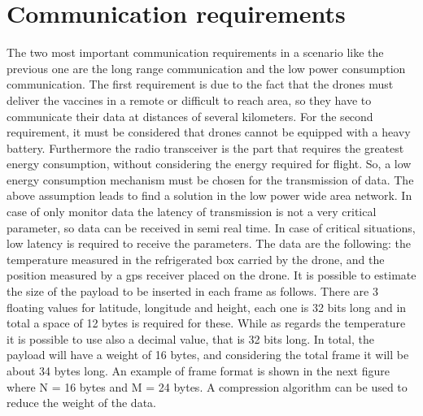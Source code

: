 \documentclass[12pt]{report}
\begin{document}
\chapter{Communication requirements}

The two most important communication requirements in a scenario like the previous one are the
long range communication and the low power consumption communication. The first requirement is 
due to the fact that the drones must deliver the vaccines in a remote or difficult to reach 
area, so they have to communicate their data at distances of several kilometers. For the second
requirement, it must be considered that drones cannot be equipped with a heavy battery. 
Furthermore the radio transceiver is the part that requires the greatest energy consumption, 
without considering the energy required for flight. So, a low energy consumption mechanism 
must be chosen for the transmission of data. The above assumption leads to find a solution in 
the low power wide area network. In case of only monitor data the latency of transmission is not a very
critical parameter, so data can be received in semi real time. In case of critical situations, low latency is required to receive the parameters. The data are 
the following:
the temperature measured in the refrigerated box carried by the drone, and
the position measured by a gps receiver placed on the drone. It is possible to estimate the size of the payload to be inserted in each frame as follows. There are 3 floating values for latitude, longitude and height, each one is 32 bits long and in total a space of 12 bytes is required for these. While as regards the temperature it is possible to use also a decimal value, that is 32 bits long. In total, the payload will have a weight of 16 bytes, and considering the total frame it will be about 34 bytes long. An example of frame format is shown in the next figure where N = 16 bytes and M = 24 bytes. A compression algorithm can be used to reduce the weight of the data.
\end{document}
